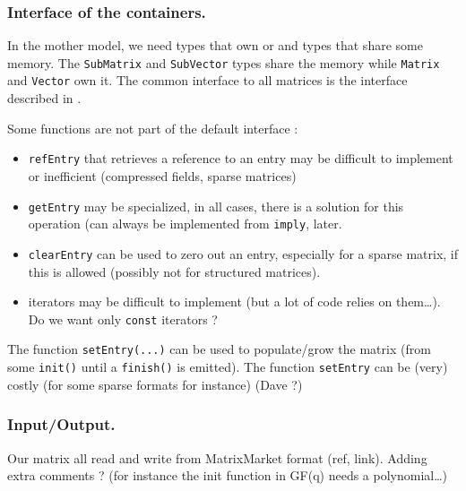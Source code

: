 \subsubsection{Interface of the containers.}
%
In the mother model, we need types that own or and types that share some
memory.  The \texttt{SubMatrix} and \texttt{SubVector} types share the memory
while \texttt{Matrix} and \texttt{Vector} own it.
%
The common interface to all matrices is the \applin  interface described in
.
%

%
\begin{remark}
%
	Some functions are not part of the default interface :
	\begin{itemize}
		\item \texttt{refEntry} that retrieves a reference to an entry
			may be difficult to implement or inefficient
			(compressed fields, sparse matrices)
		\item \texttt{getEntry} may be specialized, in all cases, there
			is a solution for this operation (can always be
			implemented from \texttt{imply}, \cf{} later.
		\item \texttt{clearEntry} can be used to zero out an entry,
			especially for a sparse matrix, if this is allowed
			(possibly not for structured matrices).
		\item iterators may be difficult to implement (but a lot of
			code relies on them\ldots). Do we want only {\tt const}
			iterators ?
	\end{itemize}
%
The function \texttt{setEntry(...)} can be used to populate/grow the matrix (from some
\texttt{init()} until a \texttt{finish()} is emitted).  The function \texttt{setEntry} can be (very)
costly (for some sparse formats for instance) (Dave ?)
%
\end{remark}
%
\subsubsection{Input/Output.}
%
Our matrix all read and write from MatrixMarket format (ref, link).
Adding extra comments ? (for instance the init function in GF(q) needs a polynomial\ldots)
%
